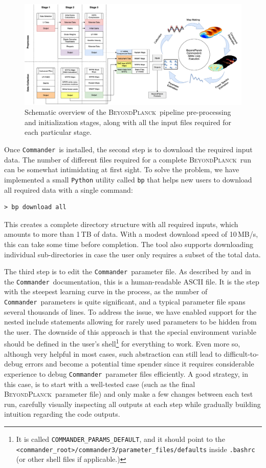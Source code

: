 \documentclass[twocolumn]{aa}
\def\commander{\texttt{Commander}}
\newcommand{\BP}{\textsc{BeyondPlanck}}
\begin{document}
\begin{figure}
      \center
      \includegraphics[width=18.5cm]{figures/bp_pipeline_reworked_v3.png}
      \caption{Schematic overview of the \BP\ pipeline pre-processing
        and initialization stages, along with all the input files
        required for each particular stage.}\label{fig:bp_pipeline_stages}
\end{figure}

Once \commander\ is installed, the second step is to download the required input data. The number of different files required for a complete \BP\ run can be somewhat intimidating at first sight. To solve the problem, we have implemented a small \texttt{Python} utility called \texttt{bp} that helps new users to download all required data with a single command:

\begin{verbatim}
> bp download all
\end{verbatim}
\noindent This creates a complete directory structure with all required inputs, which amounts to more than 1\,TB of data. With a modest download speed of 10\,MB/s, this can take some time before completion. The tool also supports downloading individual sub-directories in case the user only requires a subset of the total data.

The third step is to edit the \commander\ parameter file. As described by \citet{BP03} and in the \commander\ documentation, this is a human-readable ASCII file. It is the step with the steepest learning curve in the process, as the number of \commander\ parameters is quite significant, and a typical parameter file spans several thousands of lines. To address the issue, we have enabled support for the nested include statements allowing for rarely used parameters to be hidden from the user. The downside of this approach is that the special environment variable should be defined in the user’s shell\footnote{It is called \texttt{COMMANDER\_PARAMS\_DEFAULT}, and it should point to the \texttt{<commander\_root>/commander3/parameter\_files/defaults} inside \texttt{.bashrc} (or other shell files if applicable.)} for everything to work. Even more so, although very helpful in most cases, such abstraction can still lead to difficult-to-debug errors and become a potential time spender since it requires considerable experience to debug \commander\ parameter files efficiently. A good strategy, in this case, is to start with a well-tested case (such as the final \BP\ parameter file) and only make a few changes between each test run, carefully visually inspecting all outputs at each step while gradually building intuition regarding the code outputs.
\end{document}
